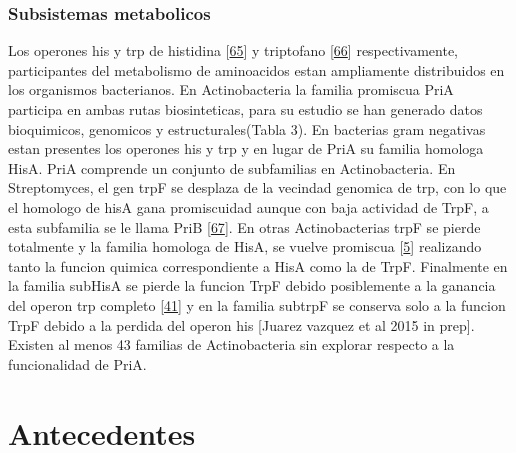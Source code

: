 \documentclass[12pt,twoside]{reedthesis}
\begin{document}
  \subsection{Subsistemas metabolicos}\label{subsistemas-metabolicos}
  
  Los operones his y trp de histidina
  {[}\protect\hyperlink{ref-fondi_evolution_2009}{65}{]} y triptofano
  {[}\protect\hyperlink{ref-merino_evolution_2008}{66}{]} respectivamente,
  participantes del metabolismo de aminoacidos estan ampliamente
  distribuidos en los organismos bacterianos. En Actinobacteria la familia
  promiscua PriA participa en ambas rutas biosinteticas, para su estudio
  se han generado datos bioquimicos, genomicos y estructurales(Tabla 3).
  En bacterias gram negativas estan presentes los operones his y trp y en
  lugar de PriA su familia homologa HisA. PriA comprende un conjunto de
  subfamilias en Actinobacteria. En Streptomyces, el gen trpF se desplaza
  de la vecindad genomica de trp, con lo que el homologo de hisA gana
  promiscuidad aunque con baja actividad de TrpF, a esta subfamilia se le
  llama PriB
  {[}\protect\hyperlink{ref-verduzco-castro_co-occurrence_2016}{67}{]}. En
  otras Actinobacterias trpF se pierde totalmente y la familia homologa de
  HisA, se vuelve promiscua
  {[}\protect\hyperlink{ref-baronagomez_occurrence_2003}{5}{]} realizando
  tanto la funcion quimica correspondiente a HisA como la de TrpF.
  Finalmente en la familia subHisA se pierde la funcion TrpF debido
  posiblemente a la ganancia del operon trp completo
  {[}\protect\hyperlink{ref-noda-garcia_evolution_2013}{41}{]} y en la
  familia subtrpF se conserva solo a la funcion TrpF debido a la perdida
  del operon his {[}Juarez vazquez et al 2015 in prep{]}. Existen al menos
  43 familias de Actinobacteria sin explorar respecto a la funcionalidad
  de PriA.
  
  \clearpage  
  
  \chapter*{Antecedentes}\label{antecedentes}
  
\end{document}
